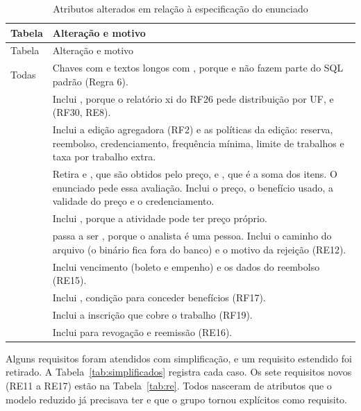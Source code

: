 \begin{longtable}{@{}L{3.2cm} L{11.1cm}@{}}
\caption{Atributos alterados em relação à especificação do enunciado}\label{tab:atributos}\\
\toprule
Tabela & Alteração e motivo\\
\midrule
\endfirsthead
\toprule
Tabela & Alteração e motivo\\
\midrule
\endhead
\bottomrule
\endfoot
Todas & Chaves com  e textos longos com , porque  e  não fazem parte do SQL padrão (Regra 6).\\
 & Inclui , porque o relatório xi do RF26 pede distribuição por UF, e  (RF30, RE8).\\
 & Inclui a edição agregadora (RF2) e as políticas da edição: reserva, reembolso, credenciamento, frequência mínima, limite de trabalhos e taxa por trabalho extra.\\
 & Retira  e , que são obtidos pelo preço, e , que é a soma dos itens. O enunciado pede essa avaliação. Inclui o preço, o benefício usado, a validade do preço e o credenciamento.\\
 & Inclui , porque a atividade pode ter preço próprio.\\
 &  passa a ser , porque o analista é uma pessoa. Inclui o caminho do arquivo (o binário fica fora do banco) e o motivo da rejeição (RE12).\\
 & Inclui vencimento (boleto e empenho) e os dados do reembolso (RE15).\\
 & Inclui , condição para conceder benefícios (RF17).\\
 & Inclui a inscrição que cobre o trabalho (RF19).\\
 & Inclui  para revogação e reemissão (RE16).\\
\end{longtable}

Alguns requisitos foram atendidos com simplificação, e um requisito estendido foi retirado. A Tabela~\ref{tab:simplificados} registra cada caso. Os sete requisitos novos (RE11 a RE17) estão na Tabela~\ref{tab:re}. Todos nasceram de atributos que o modelo reduzido já precisava ter e que o grupo tornou explícitos como requisito.

